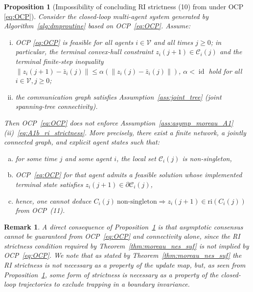 \documentclass[12pt,draftcls,onecolumn]{IEEEtran}
\newtheorem{proposition}{Proposition}
\newtheorem{remark}{Remark}
\DeclareMathOperator{\id}{id}
\def\V{\mathcal{V}}
\def\Cij{\mathcal{C}_i (j)}
\def\ri{\mathrm{ri}}
\let\rb=\partial
\begin{document}
\begin{proposition}[Impossibility of concluding RI strictness (10) from under OCP \eqref{eq:OCP}]\label{prop:impossibility}
Consider the closed-loop multi-agent system generated by Algorithm~\ref{alg:dmproutine} based on OCP~\eqref{eq:OCP}. Assume:
\begin{enumerate}[(i)]
\item OCP \eqref{eq:OCP} is feasible for all agents $i \in \V$ and all times $j\ge 0$; in particular, the terminal convex-hull constraint
$
z_i(j+1)\in \Cij
$ 
and the terminal finite-step inequality
$
\|z_i(j+1)-\bar z_i(j)\|\le \alpha(\|z_i(j)-\bar z_i(j)\|)$, $\alpha < \id$ hold for all $i \in \V,j \geq 0$;
\item the communication graph satisfies Assumption~\ref{ass:joint_tree} (joint spanning-tree connectivity).
\end{enumerate}
Then OCP~\eqref{eq:OCP} does \emph{not} enforce Assumption~\ref{ass:asymp_moreau_A1}(ii)~\eqref{eq:A1b_ri_strictness}.
More precisely, there exist a finite network, a jointly connected graph,
and explicit agent states such that:
\begin{enumerate}[(a)]
\item for some time $j$ and some agent $i$, the local set $\Cij$ is non-singleton,
\item OCP~\eqref{eq:OCP} for that agent admits a feasible solution whose implemented terminal state
satisfies $z_i(j+1)\in \rb\Cij$,
\item hence, one cannot deduce
\(
C_i(j)\ \text{non-singleton} \Rightarrow z_i(j+1)\in\ri(C_i(j))
\)
from OCP~(11).
\end{enumerate}
\end{proposition}
\begin{remark}
A direct consequence of Proposition~\ref{prop:impossibility} is that asymptotic consensus cannot be \emph{guaranteed} from OCP~\eqref{eq:OCP} and connectivity
alone, since the RI strictness condition required by Theorem~\ref{thm:moreau_nes_suf} is not
implied by OCP~\eqref{eq:OCP}.
We note that as stated by Theorem~\ref{thm:moreau_nes_suf} the RI strictness is not necessary as a property of the update map,
but, as seen from Proposition~\ref{prop:impossibility}, some form of strictness is necessary as a property of the closed-loop trajectories to exclude trapping in a boundary invariance.
\end{remark}
\end{document}

